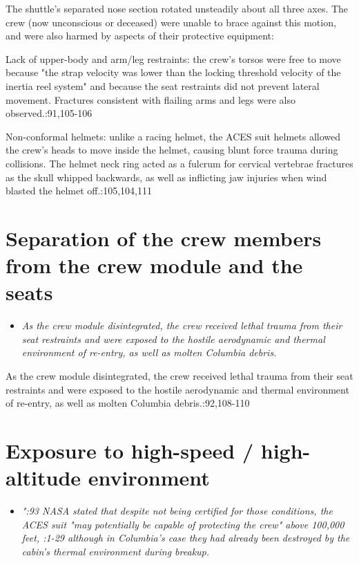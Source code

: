 The shuttle's separated nose section rotated unsteadily about all three
axes. The crew (now unconscious or deceased) were unable to brace
against this motion, and were also harmed by aspects of their protective
equipment:

Lack of upper-body and arm/leg restraints: the crew's torsos were free
to move because "the strap velocity was lower than the locking threshold
velocity of the inertia reel system" and because the seat restraints did
not prevent lateral movement. Fractures consistent with flailing arms
and legs were also observed.:91,105-106

Non-conformal helmets: unlike a racing helmet, the ACES suit helmets
allowed the crew's heads to move inside the helmet, causing blunt force
trauma during collisions. The helmet neck ring acted as a fulcrum for
cervical vertebrae fractures as the skull whipped backwards, as well as
inflicting jaw injuries when wind blasted the helmet off.:105,104,111

\section{Separation of the crew members from the crew module and the
seats}\label{separation-of-the-crew-members-from-the-crew-module-and-the-seats}

\begin{itemize}
\item
  \emph{As the crew module disintegrated, the crew received lethal
  trauma from their seat restraints and were exposed to the hostile
  aerodynamic and thermal environment of re-entry, as well as molten
  Columbia debris.}
\end{itemize}

As the crew module disintegrated, the crew received lethal trauma from
their seat restraints and were exposed to the hostile aerodynamic and
thermal environment of re-entry, as well as molten Columbia
debris.:92,108-110

\section{Exposure to high-speed / high-altitude
environment}\label{exposure-to-high-speed-high-altitude-environment}

\begin{itemize}
\item
  \emph{":93 NASA stated that despite not being certified for those
  conditions, the ACES suit "may potentially be capable of protecting
  the crew" above 100,000 feet, :1-29 although in Columbia's case they
  had already been destroyed by the cabin's thermal environment during
  breakup.}
\end{itemize}

